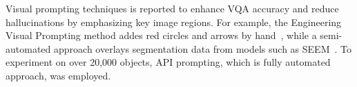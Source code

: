 Visual prompting techniques is reported to enhance VQA accuracy and reduce hallucinations by emphasizing key image regions. For example, the Engineering Visual Prompting method addes red circles and arrows by hand~\citep{redcircle, mark}, while a semi-automated approach overlays segmentation data from models such as SEEM~\citep{seem}. To experiment on over 20,000 objects, API prompting, which is fully automated approach, was employed.

